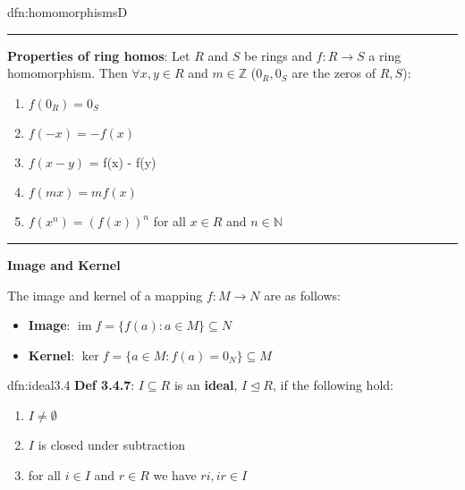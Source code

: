 \documentclass[landscape, 8pt]{extarticle}
\DeclareMathOperator{\im}{im}
\begin{document}
\begin{multicols}{3}
\begin{dfn}{dfn:homomorphisms}{D}
    \vspace{-8pt}
    \noindent\rule{\textwidth}{0.2pt}

    \textbf{Properties of ring homos}: Let $R$ and $S$ be rings and $f : R \to S$ a ring homomorphism. Then $\forall x,y\in R$ and $m\in \mathbb{Z}$ ($0_{R}, 0_{S}$ are the zeros of $R, S$):

    \vspace{-15pt}
    \begin{multicols}{2}
    \begin{enumerate}
        \setlength\itemsep{0em}
        \item $f(0_{R}) = 0_{S}$
        \item $f(-x) = -f(x)$
        \item $f(x - y)$ = f(x) - f(y)
        \item $f(mx) = mf(x)$
        \item $f(x^{n}) = (f(x))^{n}$ for all $x\in R$ and $n\in \mathbb{N}$
    \end{enumerate}
    \end{multicols}
    
    \vspace{-13pt}
    \noindent\rule{\textwidth}{0.2pt}

    \textbf{Image and Kernel}

    The image and kernel of a mapping $f : M \to N$ are as follows:
    \vspace{-5pt}

    \begin{itemize}
        \setlength\itemsep{0em}
        \item \textbf{Image}: $\im f = \{f(a) : a\in M\}\subseteq N$
        \item \textbf{Kernel}: $\ker f = \{a\in M : f(a) = 0_{N}\} \subseteq M$
    \end{itemize}


\end{dfn}


\vspace{-5pt}
\begin{dfn}{dfn:ideal}{3.4}
    \vspace{-5pt}
    \textbf{Def 3.4.7}: $I \subseteq R$ is an \textbf{ideal}, $I \unlhd R$, if the following hold:
    \begin{enumerate}
        \setlength\itemsep{0em}
        \item $I \ne \emptyset$
        \item $I$ is closed under subtraction
        \item for all $i\in I$ and $r\in R$ we have $ri, ir\in I$
    \end{enumerate}


\end{dfn}
\end{multicols}
\end{document}
